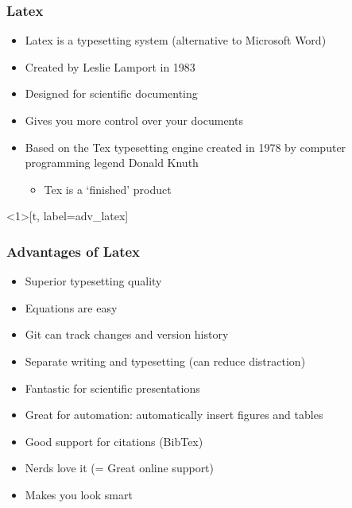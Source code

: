 \documentclass{beamer}
\begin{document}
\begin{frame}[t]\frametitle{Latex}
	\begin{itemize}
		\item Latex is a typesetting system (alternative to Microsoft Word)
		\item Created by Leslie Lamport in 1983
		\item Designed for scientific documenting
		\item Gives you more control over your documents 
		\item Based on the Tex typesetting engine created in 1978 by computer programming legend Donald Knuth 
		\begin{itemize}
			\item Tex is a `finished' product
		\end{itemize}
	\end{itemize}
\end{frame}

\begin{frame}<1>[t, label=adv_latex]\frametitle{Advantages of Latex}
	\begin{itemize}
		\item<1-> Superior typesetting quality
		\item<2-> Equations are easy
		\item<2-> Git can track changes and version history
		\item<3-> Separate writing and typesetting (can reduce distraction)
		\item<3-> Fantastic for scientific presentations
		\item<3-> Great for automation: automatically insert figures and tables
		\item<3-> Good support for citations (BibTex)
		\item<3-> Nerds love it (= Great online support)
		\item<3-> Makes you look smart
	\end{itemize}
\end{frame}
\end{document}
